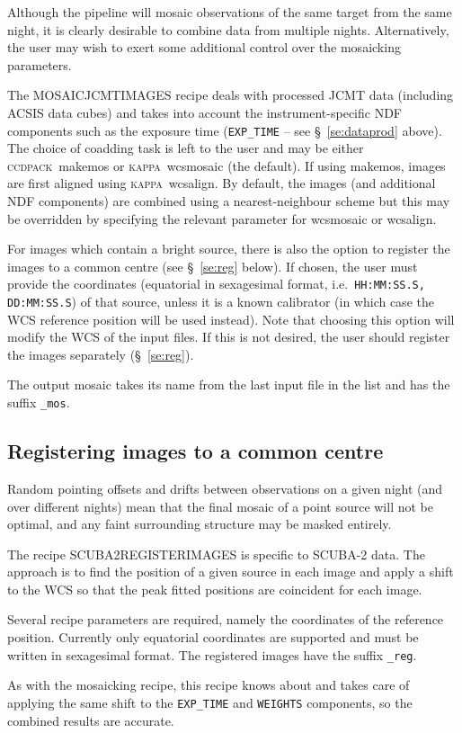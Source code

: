 \documentclass[twoside,11pt]{article}
\renewcommand{\_}{\texttt{\symbol{95}}}
\newcommand{\CCDPACK}{\textsc{ccdpack}}
\newcommand{\KAPPA}{\textsc{kappa}}
\newcommand{\task}[1]{\textsf{#1}}
\begin{document}
Although the pipeline will mosaic observations of the same target from
the same night, it is clearly desirable to combine data from multiple
nights. Alternatively, the user may wish to exert some additional
control over the mosaicking parameters.

The \task{MOSAIC\_JCMT\_IMAGES} recipe deals with processed JCMT data
(including ACSIS data cubes) and takes into account the
instrument-specific NDF components such as the exposure time
(\verb+EXP_TIME+ -- see \S\ \ref{se:dataprod} above). The choice of
coadding task is left to the user and may be either
\CCDPACK\ \task{makemos} or \KAPPA\ \task{wcsmosaic} (the default). If
using \task{makemos}, images are first aligned using
\KAPPA\ \task{wcsalign}. By default, the images (and additional NDF
components) are combined using a nearest-neighbour scheme but this may
be overridden by specifying the relevant parameter for
\task{wcsmosaic} or \task{wcsalign}.

For images which contain a bright source, there is also the option to
register the images to a common centre (see \S\ \ref{se:reg}
below). If chosen, the user must provide the coordinates (equatorial
in sexagesimal format, i.e.\ \verb+HH:MM:SS.S, DD:MM:SS.S+) of that
source, unless it is a known calibrator (in which case the WCS
reference position will be used instead). Note that choosing this
option will modify the WCS of the input files. If this is not desired,
the user should register the images separately (\S\ \ref{se:reg}).

The output mosaic takes its name from the last input file in the list
and has the suffix \verb+_mos+.

\subsection{Registering images to a common centre\label{se:reg}}

Random pointing offsets and drifts between observations on a given
night (and over different nights) mean that the final mosaic of a
point source will not be optimal, and any faint surrounding structure
may be masked entirely.

The recipe \task{SCUBA2\_REGISTER\_IMAGES} is specific to SCUBA-2
data.  The approach is to find the position of a given source in each
image and apply a shift to the WCS so that the peak fitted positions
are coincident for each image.

Several recipe parameters are required, namely the coordinates of the
reference position. Currently only equatorial coordinates are
supported and must be written in sexagesimal format. The registered
images have the suffix \verb+_reg+.

As with the mosaicking recipe, this recipe knows about and takes care
of applying the same shift to the \verb+EXP_TIME+ and \verb+WEIGHTS+
components, so the combined results are accurate.
\end{document}

